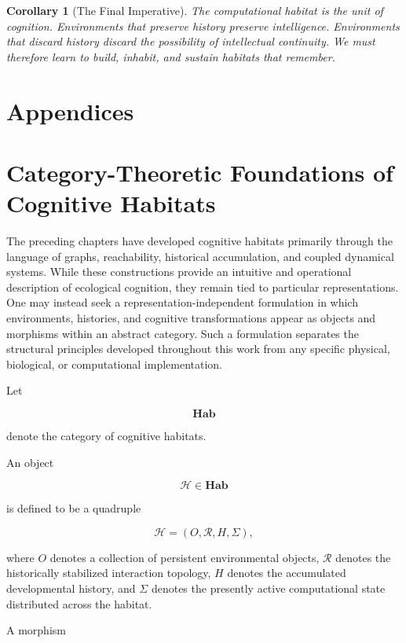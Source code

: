 \documentclass[12pt,oneside]{article}
\newtheorem{corollary}[definition]{Corollary}
\theoremstyle{remark}
\begin{document}
\begin{corollary}[The Final Imperative]
The computational habitat is the unit of cognition. Environments that preserve history preserve intelligence. Environments that discard history discard the possibility of intellectual continuity. We must therefore learn to build, inhabit, and sustain habitats that remember.
\end{corollary}


\newpage 
\section*{Appendices}

\appendix
\section{Category-Theoretic Foundations of Cognitive Habitats}

The preceding chapters have developed cognitive habitats primarily through the
language of graphs, reachability, historical accumulation, and coupled
dynamical systems. While these constructions provide an intuitive and
operational description of ecological cognition, they remain tied to particular
representations. One may instead seek a representation-independent formulation
in which environments, histories, and cognitive transformations appear as
objects and morphisms within an abstract category. Such a formulation separates
the structural principles developed throughout this work from any specific
physical, biological, or computational implementation.

Let

\[
\mathbf{Hab}
\]

denote the category of cognitive habitats.

An object

\[
\mathcal{H}\in\mathbf{Hab}
\]

is defined to be a quadruple

\[
\mathcal{H}
=
(O,\mathcal{R},H,\Sigma),
\]

where \(O\) denotes a collection of persistent environmental objects,
\(\mathcal{R}\) denotes the historically stabilized interaction topology,
\(H\) denotes the accumulated developmental history, and
\(\Sigma\) denotes the presently active computational state distributed across
the habitat.

A morphism
\end{document}
